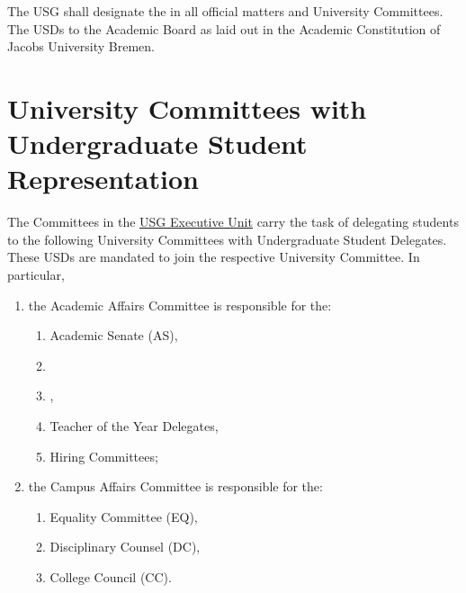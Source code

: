 
The USG shall designate the  in all official matters and University Committees. The USDs  to the Academic Board as laid out in the Academic Constitution of Jacobs University Bremen. 

\section{University Committees with Undergraduate Student Representation}
The Committees in the \hyperref[USGexecutiveUnitDef]{USG Executive Unit} carry the task of delegating students to the following University Committees with Undergraduate Student Delegates. These USDs are mandated to join the respective University Committee. In particular,
\begin{enumerate}
\item the Academic Affairs Committee is responsible for  the:
\begin{enumerate}
    \item Academic Senate (AS),
    \item {}
    \item {},
    \item Teacher of the Year Delegates,
    \item Hiring Committees;
\end{enumerate}
\item the Campus Affairs Committee is responsible for  the:
\begin{enumerate}
    \item Equality Committee (EQ),
    \item Disciplinary Counsel (DC),
    \item College Council (CC).
\end{enumerate}
\end{enumerate}

